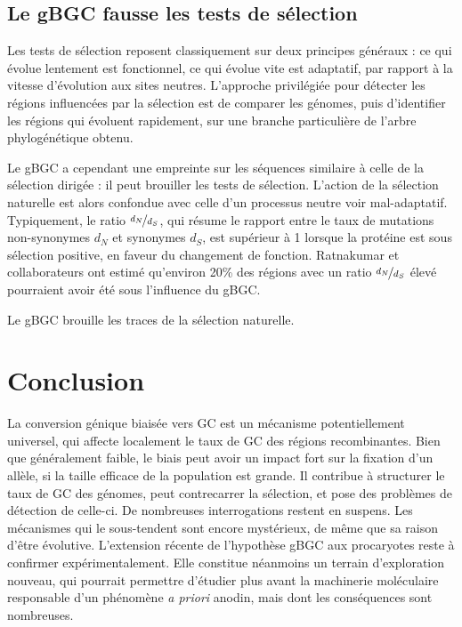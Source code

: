 \documentclass[11pt, oneside]{scrartcl}
\begin{document}
\subsection{Le gBGC fausse les tests de sélection}
\label{sec:orgheadline16}
Les tests de sélection reposent classiquement sur deux principes généraux
\cite{hurst_genetics_2009} : ce qui évolue lentement est fonctionnel, ce qui
évolue vite est adaptatif, par rapport à la vitesse d'évolution aux sites
neutres. L'approche privilégiée pour détecter les régions influencées par la
sélection est de comparer les génomes, puis d'identifier les régions qui
évoluent rapidement, sur une branche particulière de l'arbre phylogénétique
obtenu\cite{ratnakumar_detecting_2010}.

Le gBGC a cependant une empreinte sur les séquences similaire à celle de la
sélection dirigée : il peut brouiller les tests de sélection. L'action de la
sélection naturelle est alors confondue avec celle d'un processus neutre voir
mal-adaptatif. Typiquement, le ratio \(\nicefrac{d_N}{d_S}\), qui résume le
rapport entre le taux de mutations non-synonymes \(d_N\) et synonymes \(d_S\), est
supérieur à 1 lorsque la protéine est sous sélection positive, en faveur du
changement de fonction. Ratnakumar et collaborateurs ont estimé qu'environ 20\%
des régions avec un ratio \(\nicefrac{d_N}{d_S}\) élevé pourraient avoir été sous
l'influence du gBGC. 

Le gBGC brouille les traces de la sélection naturelle.  
\section*{Conclusion}
\label{sec:orgheadline18}
La conversion génique biaisée vers GC est un mécanisme potentiellement
universel, qui affecte localement le taux de GC des régions recombinantes. Bien
que généralement faible, le biais peut avoir un impact fort sur la fixation d'un
allèle, si la taille efficace de la population est grande. Il contribue à
structurer le taux de GC des génomes, peut contrecarrer la sélection, et pose
des problèmes de détection de celle-ci. De nombreuses interrogations restent en
suspens. Les mécanismes qui le sous-tendent sont encore mystérieux, de même que
sa raison d'être évolutive. L'extension récente de l'hypothèse gBGC aux
procaryotes reste à confirmer expérimentalement. Elle constitue néanmoins un
terrain d'exploration nouveau, qui pourrait permettre d'étudier plus avant la
machinerie moléculaire responsable d'un phénomène \emph{a priori} anodin, mais dont
les conséquences sont nombreuses. 


\end{document}
